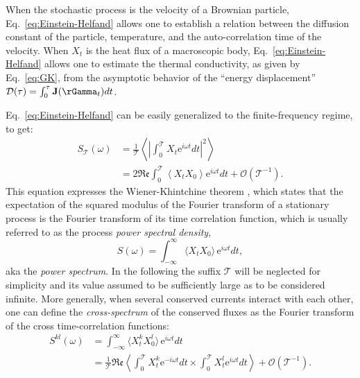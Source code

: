 When the stochastic process is the velocity of a Brownian particle, Eq.~\eqref{eq:Einstein-Helfand} allows one to establish a relation between the diffusion constant of the particle, temperature, and the auto-correlation time of the velocity.  When $X_t$ is the heat flux of a macroscopic body, Eq.~\eqref{eq:Einstein-Helfand} allows one to estimate the thermal conductivity, as given by Eq.~\eqref{eq:GK}, from the asymptotic behavior of the ``energy displacement'' $\mathcal{D}(\tau) = \int_0^\tau \mathbf{J}(\rGamma_t) dt $.

Eq.~\eqref{eq:Einstein-Helfand} can be easily generalized to the finite-frequency regime, to get:
\begin{equation}
  \begin{aligned}
    S_\mathcal{T}(\omega) &= \frac{1}{\mathcal{T}} \left \langle \left | \int_0^\mathcal{T} X_t \mathrm{e}^{i\omega t}dt \right |^2 \right \rangle \\
    &= 2\mathfrak{Re} \int_0^\mathcal{T} \left \langle X_t X_0 \right \rangle \mathrm{e}^{i\omega t}dt + \mathcal{O}(\mathcal{T}^{-1}).
  \end{aligned}
  \label{eq:Wiener-Khintchine}
\end{equation}
This equation expresses the Wiener-Khintchine theorem \citep{Wiener1930,Khintchine1934}, which states that the expectation of the squared modulus of the Fourier transform of a stationary process is the Fourier transform of its time correlation function, which is usually referred to as the process \emph{power spectral density},
\begin{equation}
  S(\omega) = \int_{-\infty}^\infty \langle X_t X_0 \rangle \,\mathrm{e}^{i\omega t} dt, \label{eq:S(omega)}
\end{equation}
aka the \emph{power spectrum}. In the following the suffix $\mathcal{T}$ will be neglected for simplicity and its value assumed to be sufficiently large as to be considered infinite. More generally, when several conserved currents interact with each other, one can define the \emph{cross-spectrum} of the conserved fluxes as the Fourier transform of the cross time-correlation functions:
\begin{equation}
  \begin{aligned}
    S^{kl}(\omega) &= \int_{-\infty}^\infty \langle X^k_t X^l_0 \rangle \,\mathrm{e}^{i\omega t} dt \\
    &= \frac{1}{\mathcal{T}} \mathfrak{Re} \left\langle \int_0^\mathcal{T} X^k_t \mathrm{e}^{-i\omega t}dt \times \int_0^\mathcal{T} X^l_t \mathrm{e}^{i\omega t}dt \right\rangle + \mathcal{O}(\mathcal{T}^{-1}).
  \end{aligned} \label{eq:Sij(omega)}
\end{equation}
